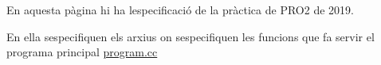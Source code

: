 En aquesta pàgina hi ha l\textquotesingle{}especificació de la pràctica de P\+R\+O2 de 2019.

En ella s\textquotesingle{}especifiquen els arxius on s\textquotesingle{}especifiquen les funcions que fa servir el programa principal \hyperlink{program_8cc}{program.\+cc} 